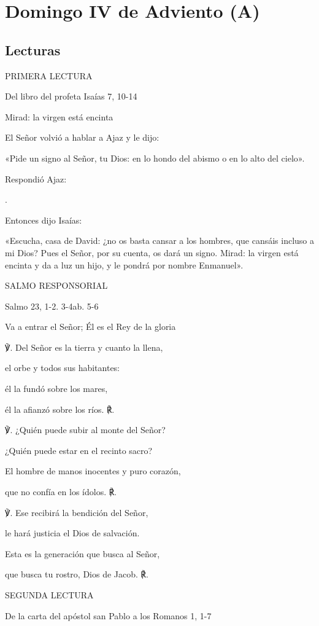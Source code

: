 \chapter{Domingo IV de Adviento (A)}

\section{Lecturas}

PRIMERA LECTURA

Del libro del profeta Isaías 7, 10-14

Mirad: la virgen está encinta

El Señor volvió a hablar a Ajaz y le dijo:

«Pide un signo al Señor, tu Dios: en lo hondo del abismo o en lo alto
del cielo».

Respondió Ajaz:

.

Entonces dijo Isaías:

«Escucha, casa de David: ¿no os basta cansar a los hombres, que cansáis
incluso a mi Dios? Pues el Señor, por su cuenta, os dará un signo.
Mirad: la virgen está encinta y da a luz un hijo, y le pondrá por nombre
Enmanuel».

SALMO RESPONSORIAL

Salmo 23, 1-2. 3-4ab. 5-6

Va a entrar el Señor; Él es el Rey de la gloria

℣. Del Señor es la tierra y cuanto la llena,

el orbe y todos sus habitantes:

él la fundó sobre los mares,

él la afianzó sobre los ríos. ℟.

℣. ¿Quién puede subir al monte del Señor?

¿Quién puede estar en el recinto sacro?

El hombre de manos inocentes y puro corazón,

que no confía en los ídolos. ℟.

℣. Ese recibirá la bendición del Señor,

le hará justicia el Dios de salvación.

Esta es la generación que busca al Señor,

que busca tu rostro, Dios de Jacob. ℟.

SEGUNDA LECTURA

De la carta del apóstol san Pablo a los Romanos 1, 1-7

